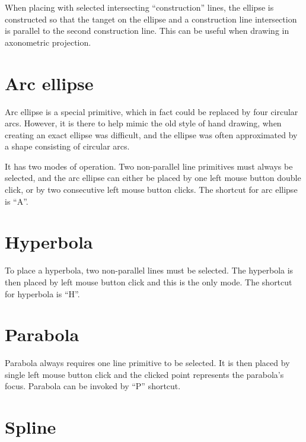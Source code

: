 When placing with selected intersecting ``construction'' lines, the ellipse is constructed
so that the tanget on the ellipse and a construction line intersection is parallel to the
second construction line. This can be useful when drawing in axonometric projection.

\section{Arc ellipse}

Arc ellipse is a special primitive, which in fact could be replaced by four circular arcs.
However, it is there to help mimic the old style of hand drawing, when creating an exact
ellipse was difficult, and the ellipse was often approximated by a shape consisting of
circular arcs.

It has two modes of operation. Two non-parallel line primitives must always be selected,
and the arc ellipse can either be placed by one left mouse button double click, or by
two consecutive left mouse button clicks. The shortcut for arc ellipse is ``A''.

\section{Hyperbola}

To place a hyperbola, two non-parallel lines must be selected. The hyperbola is then
placed by left mouse button click and this is the only mode. The shortcut for hyperbola
is ``H''.

\section{Parabola}

Parabola always requires one line primitive to be selected. It is then placed by single
left mouse button click and the clicked point represents the parabola's focus. Parabola
can be invoked by ``P'' shortcut.

\section{Spline}

